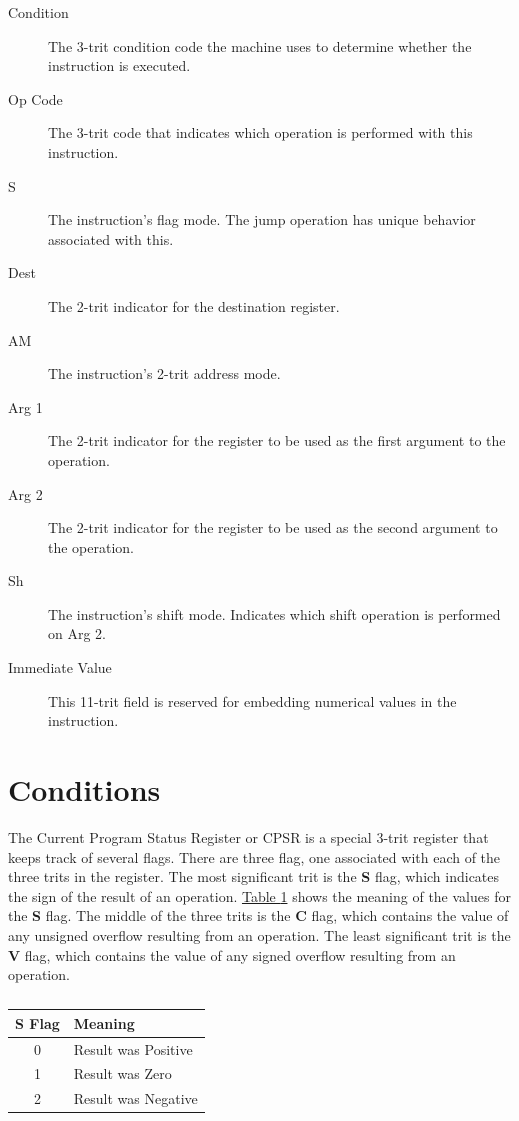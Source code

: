 \documentclass[12pt]{article}
\begin{document}
\begin{description}
\item[Condition] The 3-trit condition code the machine uses to determine whether the instruction is executed.
\item[Op Code] The 3-trit code that indicates which operation is performed with this instruction.
\item[S] The instruction's flag mode. The jump operation has unique behavior associated with this.
\item[Dest] The 2-trit indicator for the destination register.
\item[AM] The instruction's 2-trit address mode.
\item[Arg 1] The 2-trit indicator for the register to be used as the first argument to the operation.
\item[Arg 2] The 2-trit indicator for the register to be used as the second argument to the operation.
\item[Sh] The instruction's shift mode. Indicates which shift operation is performed on Arg 2.
\item[Immediate Value] This 11-trit field is reserved for embedding numerical values in the instruction.
\end{description}
    
\section{Conditions} \label{sec:Conditions}

The Current Program Status Register or CPSR is a special 3-trit register that keeps track of several
flags. There are three flag, one associated with each of the three trits in the register. The most
significant trit is the \textbf{S} flag, which indicates the sign of the result of an operation.
\hyperref[tab:S Flag Values]{Table \ref{tab:S Flag Values}} shows the meaning of the values for the
\textbf{S} flag. The middle of the three trits is the \textbf{C} flag, which contains the value of
any unsigned overflow resulting from an operation. The least significant trit is the \textbf{V} flag,
which contains the value of any signed overflow resulting from an operation.

\begin{table}[h!]
    \centering
    \caption{}
    \label{tab:S Flag Values}
    \begin{tabular}{|c|l|} 
        \hline
        \textbf{S} Flag & Meaning \\ \hline
        0 & Result was Positive \\ \hline
        1 & Result was Zero \\ \hline
        2 & Result was Negative \\ \hline
    \end{tabular}
\end{table}
\end{document}
